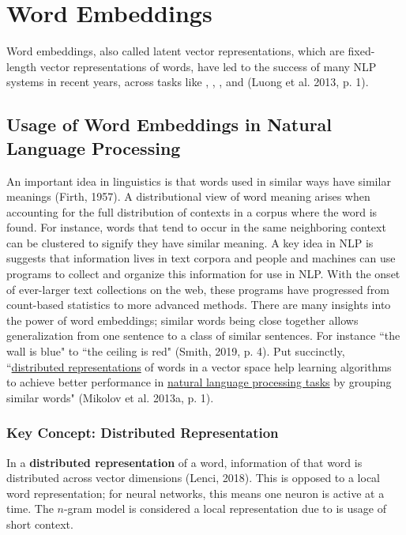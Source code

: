 \section{Word Embeddings} \label{sec:WordEmbeddings}

Word embeddings, also called latent vector representations, which are fixed-length vector representations of words, have led to the success of many NLP systems in recent years, across tasks like , , , and  (Luong et al. 2013, p. 1).

\subsection{Usage of Word Embeddings in Natural Language Processing} \label{sec:WordEmb_Useage}

An important idea in linguistics is that words used in similar ways have similar meanings (Firth, 1957). A distributional view of word meaning arises when accounting for the full distribution of contexts in a corpus where the word is found. For instance, words that tend to occur in the same neighboring context can be clustered to signify they have similar meaning. A key idea in NLP is suggests that information lives in text corpora and people and machines can use programs to collect and organize this information for use in NLP. With the onset of ever-larger text collections on the web, these programs have progressed from count-based statistics to more advanced methods. There are many insights into the power of word embeddings; similar words being close together allows generalization from one sentence to a class of similar sentences. For instance ``the wall is blue" to ``the ceiling is red" (Smith, 2019, p. 4). Put succinctly, ``\hyperref[sec:DistributedRepr]{distributed representations} of words in a vector space help learning algorithms to achieve better performance in \hyperref[app:Appendix_NLPTasks]{natural language processing tasks} by grouping similar words" (Mikolov et al. 2013a, p. 1). 

\subsubsection{Key Concept: Distributed Representation} \label{sec:DistributedRepr}

In a \textbf{distributed representation} of a word, information of that word is distributed across vector dimensions (Lenci, 2018). This is opposed to a local word representation; for neural networks, this means one neuron is active at a time. The $n$-gram model is considered a local representation due to is usage of short context. 

